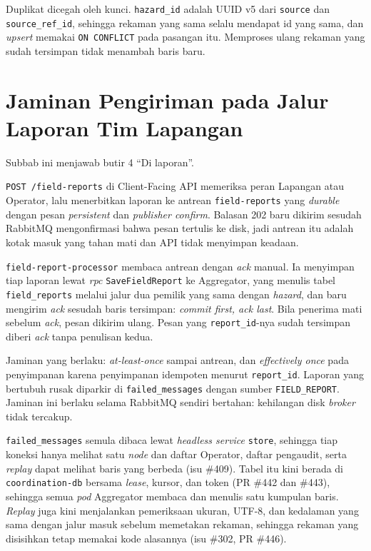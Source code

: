 Duplikat dicegah oleh kunci. \texttt{hazard\_id} adalah UUID v5 dari \texttt{source} dan \texttt{source\_ref\_id}, sehingga rekaman yang sama selalu mendapat id yang sama, dan \textit{upsert} memakai \texttt{ON CONFLICT} pada pasangan itu. Memproses ulang rekaman yang sudah tersimpan tidak menambah baris baru.

\section{Jaminan Pengiriman pada Jalur Laporan Tim Lapangan}

Subbab ini menjawab butir 4 ``Di laporan''.

\texttt{POST /field-reports} di Client-Facing API memeriksa peran Lapangan atau Operator, lalu menerbitkan laporan ke antrean \texttt{field-reports} yang \textit{durable} dengan pesan \textit{persistent} dan \textit{publisher confirm}. Balasan 202 baru dikirim sesudah RabbitMQ mengonfirmasi bahwa pesan tertulis ke disk, jadi antrean itu adalah kotak masuk yang tahan mati dan API tidak menyimpan keadaan.

\texttt{field-report-processor} membaca antrean dengan \textit{ack} manual. Ia menyimpan tiap laporan lewat \textit{rpc} \texttt{SaveFieldReport} ke Aggregator, yang menulis tabel \texttt{field\_reports} melalui jalur dua pemilik yang sama dengan \textit{hazard}, dan baru mengirim \textit{ack} sesudah baris tersimpan: \textit{commit first, ack last}. Bila penerima mati sebelum \textit{ack}, pesan dikirim ulang. Pesan yang \texttt{report\_id}-nya sudah tersimpan diberi \textit{ack} tanpa penulisan kedua.

Jaminan yang berlaku: \textit{at-least-once} sampai antrean, dan \textit{effectively once} pada penyimpanan karena penyimpanan idempoten menurut \texttt{report\_id}. Laporan yang bertubuh rusak diparkir di \texttt{failed\_messages} dengan sumber \texttt{FIELD\_REPORT}. Jaminan ini berlaku selama RabbitMQ sendiri bertahan: kehilangan disk \textit{broker} tidak tercakup.

\texttt{failed\_messages} semula dibaca lewat \textit{headless service} \texttt{store}, sehingga tiap koneksi hanya melihat satu \textit{node} dan daftar Operator, daftar pengaudit, serta \textit{replay} dapat melihat baris yang berbeda (isu \#409). Tabel itu kini berada di \texttt{coordination-db} bersama \textit{lease}, kursor, dan token (PR \#442 dan \#443), sehingga semua \textit{pod} Aggregator membaca dan menulis satu kumpulan baris. \textit{Replay} juga kini menjalankan pemeriksaan ukuran, UTF-8, dan kedalaman yang sama dengan jalur masuk sebelum memetakan rekaman, sehingga rekaman yang disisihkan tetap memakai kode alasannya (isu \#302, PR \#446).

